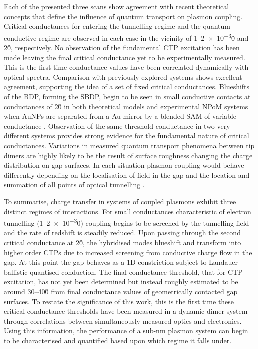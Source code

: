 \documentclass[a4paper, 11pt]{article}
\begin{document}
Each of the presented three scans show agreement with recent theoretical concepts that define the influence of quantum transport on plasmon coupling. Critical conductances for entering the tunnelling regime and the quantum conductive regime are observed in each case in the vicinity of 1--\num{2e-3}\G0 and 2\G0, respectively. No observation of the fundamental CTP excitation has been made leaving the final critical conductance yet to be experimentally measured. This is the first time conductance values have been correlated dynamically with optical spectra. Comparison with previously explored systems shows excellent agreement, supporting the idea of a set of fixed critical conductances. Blueshifts of the BDP, forming the SBDP, begin to be seen in small conductive contacts at conductances of 2\G0 in both theoretical models \cite{perez2010, perez2011} and experimental NPoM systems when AuNPs are separated from a Au mirror by a blended SAM of variable conductance \cite{benz2014}. Observation of the same threshold conductance in two very different systems provides strong evidence for the fundamental nature of critical conductances. Variations in measured quantum transport phenomena between tip dimers are highly likely to be the result of surface roughness changing the charge distribution on gap surfaces. In each situation plasmon coupling would behave differently depending on the localisation of field in the gap and the location and summation of all points of optical tunnelling \cite{barbry2015}.

To summarise, charge transfer in systems of coupled plasmons exhibit three distinct regimes of interactions. For small conductances characteristic of electron tunnelling (1--\num{2e-3}\G0) coupling begins to be screened by the tunnelling field and the rate of redshift is steadily reduced. Upon passing through the second critical conductance at 2\G0, the hybridised modes blueshift and transform into higher order CTPs due to increased screening from conductive charge flow in the gap. At this point the gap behaves as a 1D constriction subject to Landauer ballistic quantised conduction. The final conductance threshold, that for CTP excitation, has not yet been determined but instead roughly estimated to be around 30--40\G0 from final conductance values of geometrically contacted gap surfaces. To restate the significance of this work, this is the first time these critical conductance thresholds have been measured in a dynamic dimer system through correlations between simultaneously measured optics and electronics. Using this information, the performance of a sub-nm plasmon system can begin to be characterised and quantified based upon which regime it falls under.
\end{document}

